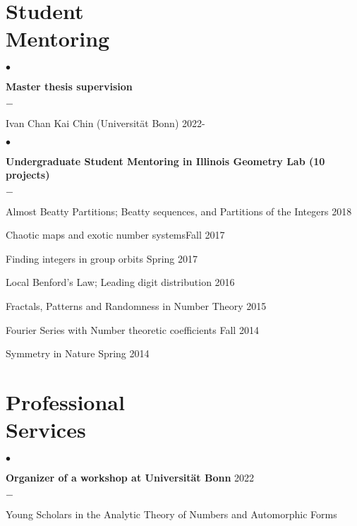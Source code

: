 \documentclass[margin,line,pifont,palatino,courier,10pt]{res}
\newenvironment{list1}{
  \begin{list}{$\bullet$}{%
      \setlength{\itemsep}{0in}
      \setlength{\parsep}{0in} \setlength{\parskip}{0in}
      \setlength{\topsep}{0in} \setlength{\partopsep}{0in}
      \setlength{\leftmargin}{0.17in}}}{\end{list}}
\newenvironment{list2}{
  \begin{list}{$-$}{%
      \setlength{\itemsep}{0in}
      \setlength{\parsep}{0in} \setlength{\parskip}{0in}
      \setlength{\topsep}{0in} \setlength{\partopsep}{0in}
      \setlength{\leftmargin}{0.2in}}}{\end{list}}
\begin{document}
\begin{resume}
\section{\sc Student \\Mentoring}
\begin{list1}
	\item \textbf{Master thesis supervision}
	\begin{list2}
		\item Ivan Chan Kai Chin (Universit\"at Bonn) {\hfill 2022-}
	\end{list2}
\end{list1}
\begin{list1}
	\item \textbf{Undergraduate Student Mentoring in Illinois Geometry Lab (10 projects)}
	\begin{list2}
		\item Almost Beatty Partitions;  Beatty sequences, and Partitions of the Integers {\hfill   2018}
		\item Chaotic maps and exotic number systems{\hfill  Fall 2017}
		\item Finding integers in group orbits {\hfill  Spring 2017}
		\item Local Benford's Law; Leading digit distribution {\hfill  2016} 
		\item Fractals, Patterns and Randomness in Number Theory {\hfill 2015} 
		\item Fourier Series with Number theoretic coefficients {\hfill  Fall 2014} 
		\item Symmetry in Nature {\hfill Spring 2014}
	\end{list2}
\end{list1}

\section{\sc Professional \\Services}

\begin{list1}
	\item \textbf{Organizer of a workshop at Universit\"at Bonn} {\hfill  2022}
	
	\begin{list2}
		\item Young Scholars in the Analytic Theory of
		Numbers and Automorphic Forms
	\end{list2}
	

\end{list1}
\end{resume}
\end{document}
